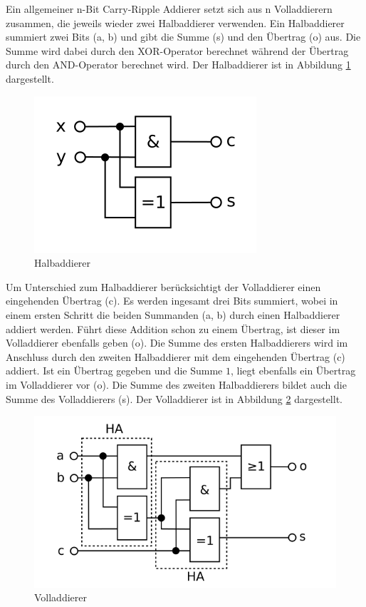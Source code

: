 Ein allgemeiner n-Bit Carry-Ripple Addierer setzt sich aus n Volladdierern zusammen, die jeweils wieder zwei Halbaddierer verwenden. Ein Halbaddierer summiert zwei
Bits (a, b) und gibt die Summe (s) und den Übertrag (o) aus. Die Summe wird dabei durch den XOR-Operator berechnet während der Übertrag durch den AND-Operator
berechnet wird. Der Halbaddierer ist in Abbildung \ref{fig:halfadder} dargestellt.
\begin{figure}[!h]
  \centering
  \includegraphics[scale=1]{images/halfadder}
  \caption[Halbaddierer]{Halbaddierer\protect\footnotemark}
  \label{fig:halfadder}
\end{figure}

Um Unterschied zum Halbaddierer berücksichtigt der Volladdierer einen eingehenden Übertrag (c). Es werden ingesamt drei Bits summiert, wobei in einem ersten Schritt
die beiden Summanden (a, b) durch einen Halbaddierer addiert werden. Führt diese Addition schon zu einem Übertrag, ist dieser im Volladdierer ebenfalls geben (o).
Die Summe des ersten Halbaddierers wird im Anschluss durch den zweiten Halbaddierer mit dem eingehenden Übertrag (c) addiert. Ist ein Übertrag gegeben und die
Summe $1$, liegt ebenfalls ein Übertrag im Volladdierer vor (o). Die Summe des zweiten Halbaddierers bildet auch die Summe des Volladdierers (s). Der Volladdierer
ist in Abbildung \ref{fig:fulladder} dargestellt.  \clearpage
\begin{figure}[!h]
  \centering
  \includegraphics[scale=1]{images/fulladder}
  \caption[Volladdierer]{Volladdierer\protect\footnotemark}
  \label{fig:fulladder}
\end{figure}

